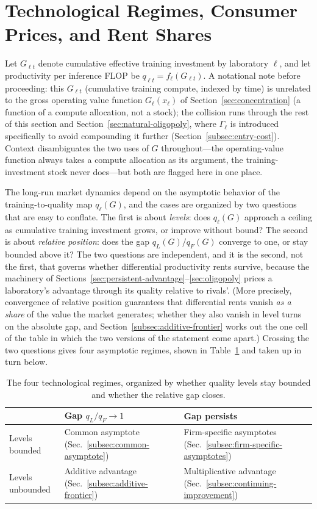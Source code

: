 \documentclass[11pt]{article}
\begin{document}
\section{Technological Regimes, Consumer Prices, and Rent Shares}
\label{sec:technology-regimes}

Let $G_{\ell t}$ denote cumulative effective training investment by laboratory $\ell$, and let productivity per inference FLOP be $q_{\ell t}=f_\ell(G_{\ell t})$. A notational note before proceeding: this $G_{\ell t}$ (cumulative training compute, indexed by time) is unrelated to the gross operating value function $G_\ell(x_\ell)$ of Section~\ref{sec:concentration} (a function of a compute allocation, not a stock); the collision runs through the rest of this section and Section~\ref{sec:natural-oligopoly}, where $\Gamma_\ell$ is introduced specifically to avoid compounding it further (Section~\ref{subsec:entry-cost}). Context disambiguates the two uses of $G$ throughout---the operating-value function always takes a compute allocation as its argument, the training-investment stock never does---but both are flagged here in one place.

The long-run market dynamics depend on the asymptotic behavior of the training-to-quality map $q_\ell(G)$, and the cases are organized by two questions that are easy to conflate. The first is about \emph{levels}: does $q_\ell(G)$ approach a ceiling as cumulative training investment grows, or improve without bound? The second is about \emph{relative position}: does the gap $q_L(G)/q_F(G)$ converge to one, or stay bounded above it? The two questions are independent, and it is the second, not the first, that governs whether differential productivity rents survive, because the machinery of Sections~\ref{sec:persistent-advantage}--\ref{sec:oligopoly} prices a laboratory's advantage through its quality relative to rivals'. (More precisely, convergence of relative position guarantees that differential rents vanish \emph{as a share} of the value the market generates; whether they also vanish in level turns on the absolute gap, and Section~\ref{subsec:additive-frontier} works out the one cell of the table in which the two versions of the statement come apart.) Crossing the two questions gives four asymptotic regimes, shown in Table~\ref{tab:regime-grid} and taken up in turn below.

\begin{table}[htbp]
\centering
\caption{The four technological regimes, organized by whether quality levels stay bounded and whether the relative gap closes.}
\label{tab:regime-grid}
\begin{tabular}{lll}
\hline
 & Gap $q_L/q_F\rightarrow1$ & Gap persists \\
\hline
Levels bounded & Common asymptote (Sec.~\ref{subsec:common-asymptote}) & Firm-specific asymptotes (Sec.~\ref{subsec:firm-specific-asymptotes}) \\
Levels unbounded & Additive advantage (Sec.~\ref{subsec:additive-frontier}) & Multiplicative advantage (Sec.~\ref{subsec:continuing-improvement}) \\
\hline
\end{tabular}
\end{table}
\end{document}
